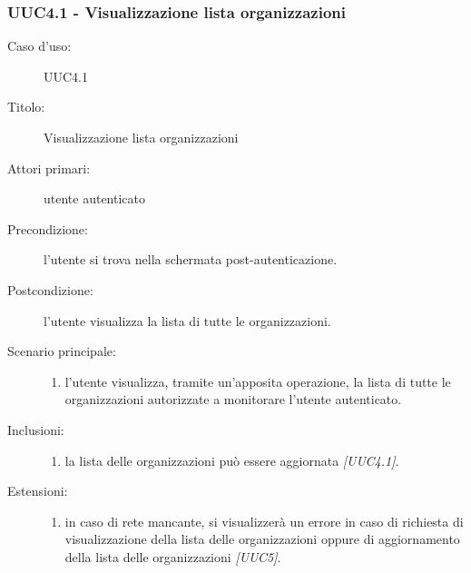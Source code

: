 \documentclass[casi-duso]{subfiles}
\begin{document}
\subsubsection{UUC4.1 - Visualizzazione lista organizzazioni}%
\label{subsub:UUC4.1utente}
\begin{description}
  \item[Caso d’uso:] UUC4.1
  \item[Titolo:] Visualizzazione lista organizzazioni
  \item[Attori primari:] utente autenticato
  \item[Precondizione:] l'utente si trova nella schermata post-autenticazione.
  \item[Postcondizione:] l'utente visualizza la lista di tutte le organizzazioni.
  \item[Scenario principale:]
        \begin{enumerate}
          \item l'utente visualizza, tramite un'apposita operazione, la lista di tutte le organizzazioni autorizzate a monitorare l'utente autenticato.
        \end{enumerate}
  \item[Inclusioni:]
        \begin{enumerate}
          \item la lista delle organizzazioni può essere aggiornata \emph{[UUC4.1]}.
        \end{enumerate}
  \item[Estensioni:]
        \begin{enumerate}
          \item in caso di rete mancante, si visualizzerà un errore in caso di richiesta di visualizzazione della lista delle organizzazioni
                oppure di aggiornamento della lista delle organizzazioni \emph{[UUC5]}.
        \end{enumerate}
\end{description}

\end{document}
